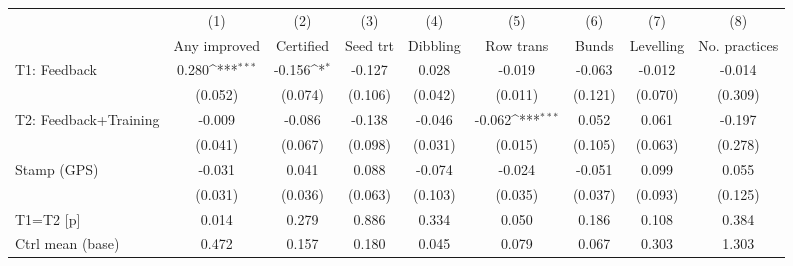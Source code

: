 {
\def\sym#1{\ifmmode^{#1}\else\(^{#1}\)\fi}
\begin{tabular}{l*{8}{c}}
\toprule
                    &\multicolumn{1}{c}{(1)}&\multicolumn{1}{c}{(2)}&\multicolumn{1}{c}{(3)}&\multicolumn{1}{c}{(4)}&\multicolumn{1}{c}{(5)}&\multicolumn{1}{c}{(6)}&\multicolumn{1}{c}{(7)}&\multicolumn{1}{c}{(8)}\\
                    &\multicolumn{1}{c}{Any improved}&\multicolumn{1}{c}{Certified}&\multicolumn{1}{c}{Seed trt}&\multicolumn{1}{c}{Dibbling}&\multicolumn{1}{c}{Row trans}&\multicolumn{1}{c}{Bunds}&\multicolumn{1}{c}{Levelling}&\multicolumn{1}{c}{No. practices}\\
\midrule
T1: Feedback        &       0.280\sym{***}&      -0.156\sym{*}  &      -0.127         &       0.028         &      -0.019         &      -0.063         &      -0.012         &      -0.014         \\
                    &     (0.052)         &     (0.074)         &     (0.106)         &     (0.042)         &     (0.011)         &     (0.121)         &     (0.070)         &     (0.309)         \\
T2: Feedback+Training&      -0.009         &      -0.086         &      -0.138         &      -0.046         &      -0.062\sym{***}&       0.052         &       0.061         &      -0.197         \\
                    &     (0.041)         &     (0.067)         &     (0.098)         &     (0.031)         &     (0.015)         &     (0.105)         &     (0.063)         &     (0.278)         \\
Stamp (GPS)         &      -0.031         &       0.041         &       0.088         &      -0.074         &      -0.024         &      -0.051         &       0.099         &       0.055         \\
                    &     (0.031)         &     (0.036)         &     (0.063)         &     (0.103)         &     (0.035)         &     (0.037)         &     (0.093)         &     (0.125)         \\
\midrule
T1=T2 [p]           &       0.014         &       0.279         &       0.886         &       0.334         &       0.050         &       0.186         &       0.108         &       0.384         \\
Ctrl mean (base)    &       0.472         &       0.157         &       0.180         &       0.045         &       0.079         &       0.067         &       0.303         &       1.303         \\

\end{tabular}}
